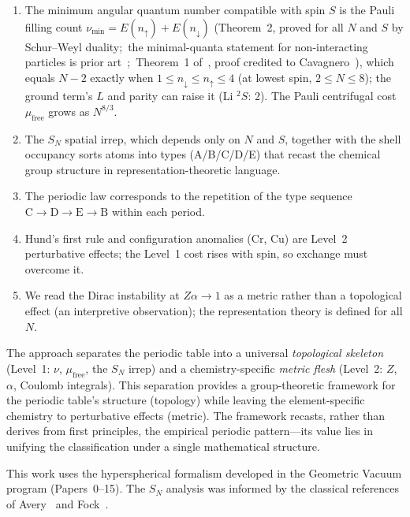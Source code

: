 \documentclass[aps,prl,twocolumn,superscriptaddress,longbibliography]{revtex4-2}
\newcommand{\mufree}{\mu_{\mathrm{free}}}
\begin{document}
\begin{enumerate}
  \item The minimum angular quantum number compatible with spin $S$
    is the Pauli filling count $\nu_{\min} = E(n_\uparrow) +
    E(n_\downarrow)$ (Theorem~2, proved for all $N$ and $S$ by
    Schur--Weyl duality;\ the minimal-quanta statement for
    non-interacting particles is prior
    art~\cite{Rittenhouse2006, FabreDeLaRipelle2004};\ Theorem~1
    of~\cite{Rittenhouse2006}, proof credited to
    Cavagnero~\cite{Cavagnero1986}), which equals $N-2$ exactly when
    $1 \le n_\downarrow \le n_\uparrow \le 4$ (at lowest spin,
    $2 \le N \le 8$); the ground
    term's $L$ and parity can raise it (Li ${}^2S$: 2).  The Pauli
    centrifugal cost $\mufree$ grows as $N^{8/3}$.

  \item The $S_N$ spatial irrep, which depends only on $N$ and $S$,
    together with the shell occupancy sorts atoms into
    types (A/B/C/D/E) that recast the chemical group structure in
    representation-theoretic language.

  \item The periodic law corresponds to the repetition of the type
    sequence $\mathrm{C} \to \mathrm{D} \to \mathrm{E} \to
    \mathrm{B}$ within each period.

  \item Hund's first rule and configuration anomalies (Cr, Cu) are
    Level~2 perturbative effects; the Level~1 cost rises with spin,
    so exchange must overcome it.

  \item We read the Dirac instability at $Z\alpha \to 1$ as a metric
    rather than a topological effect (an interpretive observation);
    the representation theory is defined for all $N$.
\end{enumerate}

The approach separates the periodic table into a universal
\emph{topological skeleton} (Level~1: $\nu$, $\mufree$, the $S_N$
irrep) and a chemistry-specific \emph{metric flesh} (Level~2: $Z$,
$\alpha$, Coulomb integrals).  This separation provides a
group-theoretic framework for the periodic table's structure
(topology) while leaving the element-specific chemistry to
perturbative effects (metric).  The framework recasts, rather than
derives from first principles, the empirical periodic pattern---its
value lies in unifying the classification under a single
mathematical structure.

\begin{acknowledgments}
This work uses the hyperspherical formalism developed in the Geometric
Vacuum program (Papers~0--15).  The $S_N$ analysis was informed by the
classical references of Avery~\cite{Avery2000} and
Fock~\cite{Fock1935, Fock1954}.
\end{acknowledgments}
\end{document}
